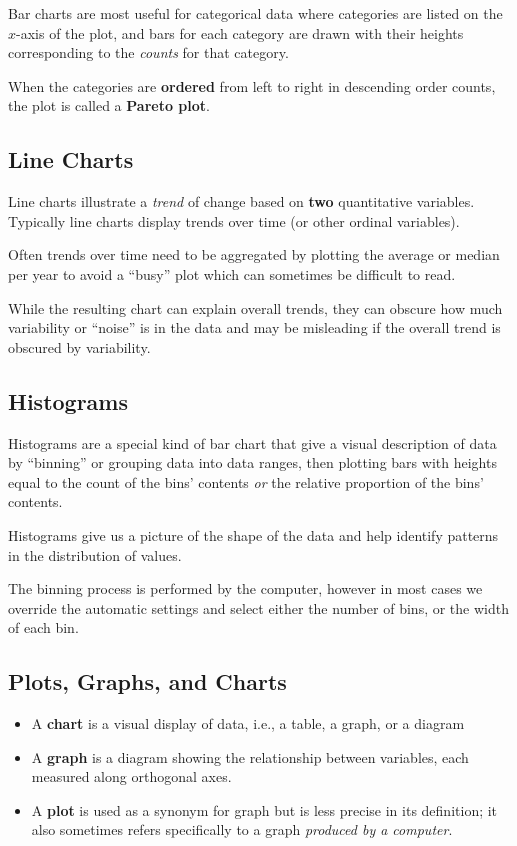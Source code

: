 \documentclass{article}
\begin{document}
Bar charts are most useful for categorical data where categories are listed on the \(x\)-axis of the plot, and bars for each category are drawn with their heights corresponding to the \textit{counts} for that category.

When the categories are \textbf{ordered} from left to right in descending order counts, the plot is called a \textbf{Pareto plot}.
\subsection{Line Charts}
Line charts illustrate a \textit{trend} of change based on \textbf{two} quantitative variables. Typically line charts display trends over time (or other ordinal variables).

Often trends over time need to be aggregated by plotting the average or median per year to avoid a ``busy'' plot which can sometimes be difficult to read.

While the resulting chart can explain overall trends, they can obscure how much variability or ``noise''
is in the data and may be misleading if the overall trend is obscured by variability.
\subsection{Histograms}
Histograms are a special kind of bar chart that give a visual description of data by ``binning'' or grouping data into data ranges,
then plotting bars with heights equal to the count of the bins' contents \textit{or} the relative proportion of the bins' contents.

Histograms give us a picture of the shape of the data and help identify patterns in the distribution of values.

The binning process is performed by the computer, however in most cases we override the automatic settings and select either the number of
bins, or the width of each bin.
\subsection{Plots, Graphs, and Charts}
\begin{itemize}
    \item A \textbf{chart} is a visual display of data, i.e., a table, a graph, or a diagram
    \item A \textbf{graph} is a diagram showing the relationship between variables, each measured along orthogonal axes.
    \item A \textbf{plot} is used as a synonym for graph but is less precise in its definition; it also sometimes refers specifically to a graph \textit{produced by a computer}.
\end{itemize}
\end{document}
